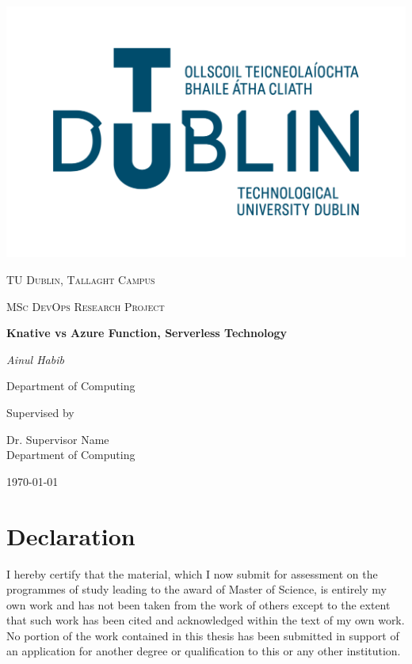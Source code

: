 \documentclass[12pt]{article}
\begin{document}
\thispagestyle{empty}
\setlength\headheight{0pt} 
\begin{center}

\begin{center}
\includegraphics[width=0.65\linewidth]{images/TUD_Logo.png}            
\end{center}	

        \vspace{0.25cm}
        {\scshape\LARGE TU Dublin, Tallaght Campus \par}
        \vspace{0.25cm}
        {\scshape\Large MSc DevOps Research Project \par}
        \vspace{0.5cm}

        {\Large\bfseries Knative vs Azure Function, Serverless Technology \par}
        
        \vspace{0.5cm}
        {\Large\itshape Ainul Habib\par}
        Department of Computing
        \vspace{0.25cm}

\vspace{1cm}
Supervised by\par
Dr. Supervisor Name \\
Department of Computing\par
\vspace{1.5cm}
\large
\today

\end{center}

\clearpage
\restoregeometry
\justify

\section*{Declaration}
I hereby certify that the material, which I now submit for assessment on the programmes of study leading to the award of Master of Science, is entirely my own work and has not been taken from the work of others except to the extent that such work has been cited and acknowledged within the text of my own work. No portion of the work contained in this thesis has been submitted in support of an application for another degree or qualification to this or any other institution.
\end{document}
